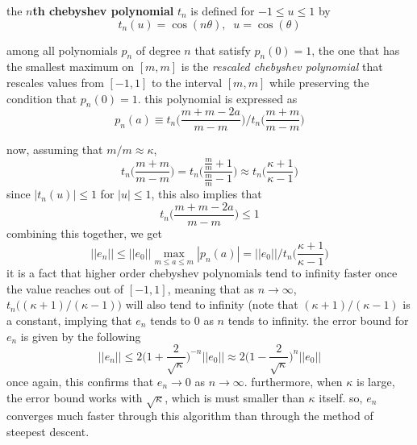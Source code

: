   \begin{definition}
  the \textbf{$n$th chebyshev polynomial} $t_n$ is defined for $-1 \leq u \leq 1$ by
  \[t_n (u) = \cos (n \theta), \;\; u = \cos(\theta)\]
  \end{definition}

  \begin{proposition}
  among all polynomials $p_n$ of degree $n$ that satisfy $p_n (0) = 1$, the one that has the smallest maximum on $[m, m]$ is the \textit{rescaled chebyshev polynomial} that rescales values from $[-1, 1]$ to the interval $[m, m]$ while preserving the condition that $p_n (0) = 1$. this polynomial is expressed as
  \[p_n (a) \equiv t_n \bigg( \frac{m+m-2a}{m-m} \bigg) \bigg/ t_n \bigg(\frac{m+m}{m-m} \bigg)\]
  \end{proposition} 
  now, assuming that $m/m \approx \kappa$, 
  \[t_n \bigg( \frac{m+m}{m-m} \bigg) = t_n \bigg(\frac{\frac{m}{m} + 1}{\frac{m}{m}-1} \bigg) \approx t_n \bigg(\frac{\kappa + 1}{\kappa - 1} \bigg)\]
  since $|t_n (u)| \leq 1$ for $|u| \leq 1$, this also implies that
  \[t_n \bigg( \frac{m + m - 2a}{m-m} \bigg) \leq 1\]
  combining this together, we get
  \[||e_n|| \leq ||e_0|| \max_{m \leq a \leq m} |p_n (a)| = ||e_0|| \bigg/ t_n \bigg( \frac{\kappa+1}{\kappa-1} \bigg)\]
  it is a fact that higher order chebyshev polynomials tend to infinity faster once the value reaches out of $[-1, 1]$, meaning that as $n \rightarrow \infty$, $t_n\big( (\kappa+1)/(\kappa-1)\big)$ will also tend to infinity (note that $(\kappa+1)/(\kappa-1)$ is a constant, implying that $e_n$ tends to $0$ as $n$ tends to infinity. the error bound for $e_n$ is given by the following 
  \[||e_n|| \leq 2 \bigg( 1 + \frac{2}{\sqrt{\kappa}} \bigg)^{-n} ||e_0|| \approx 2 \bigg( 1 - \frac{2}{\sqrt{\kappa}} \bigg)^{n} ||e_0||\]
  once again, this confirms that $e_n \rightarrow 0$ as $n \rightarrow \infty$. furthermore, when $\kappa$ is large, the error bound works with $\sqrt{\kappa}$, which is must smaller than $\kappa$ itself. so, $e_n$ converges much faster through this algorithm than through the method of steepest descent. 

